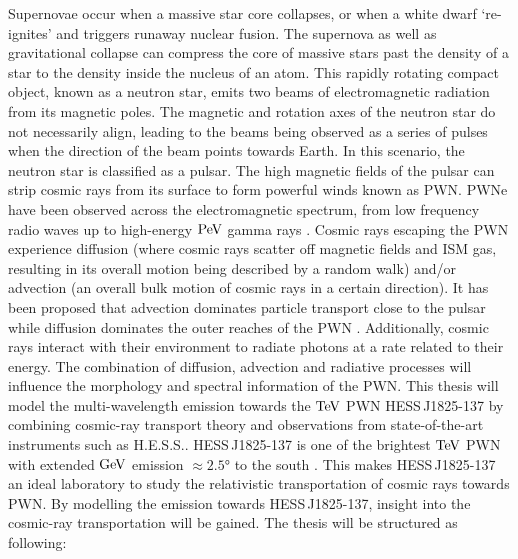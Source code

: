 Supernovae occur when a massive star core collapses, or when a white dwarf `re-ignites' and triggers runaway nuclear fusion. The supernova as well as gravitational collapse can compress the core of massive stars past the density of a star to the density inside the nucleus of an atom. This rapidly rotating compact object, known as a neutron star, emits two beams of electromagnetic radiation from its magnetic poles. The magnetic and rotation axes of the neutron star do not necessarily align, leading to the beams being observed as a series of pulses when the direction of the beam points towards Earth. In this scenario, the neutron star is classified as a pulsar. The high magnetic fields of the pulsar can strip cosmic rays from its surface to form powerful winds known as PWN. PWNe have been observed across the electromagnetic spectrum, from low frequency radio waves \citep{1968Natur.217..709H} up to high-energy $\PeV$ gamma rays \citep{doi:10.1126/science.abg5137}.
\newpar
Cosmic rays escaping the PWN experience diffusion (where cosmic rays scatter off magnetic fields and ISM gas, resulting in its overall motion being described by a random walk) and/or advection (an overall bulk motion of cosmic rays in a certain direction). It has been proposed that advection dominates particle transport close to the pulsar while diffusion dominates the outer reaches of the PWN \citep{2020A&A...636A.113G, 2021PhRvD.104l3017R}. Additionally, cosmic rays interact with their environment to radiate photons at a rate related to their energy. The combination of diffusion, advection and radiative processes will influence the morphology and spectral information of the PWN.
\newpar 
This thesis will model the multi-wavelength emission towards the $\TeV$ PWN \linebreak \mbox{HESS\,J1825-137} by combining cosmic-ray transport theory and observations from state-of-the-art instruments such as H.E.S.S.. \mbox{HESS\,J1825-137} is one of the brightest $\TeV$ PWN with extended $\si{\giga\electronvolt}$ emission $\approx \ang{2.5}$ to the south \citep{2019MNRAS.485.1001A}. This makes \mbox{HESS\,J1825-137} an ideal laboratory to study the relativistic transportation of cosmic rays towards PWN. By modelling the emission towards \mbox{HESS\,J1825-137}, insight into the cosmic-ray transportation will be gained.
\newpar
The thesis will be structured as following:
